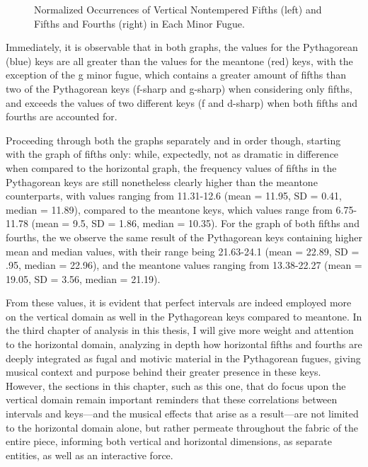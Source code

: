 \begin{figure}[H]
    \begin{center}
    \caption[Normalized Occurrences of Vertical Nontempered Fifths and Fourths in Each Minor Fugue. ]{Normalized Occurrences of Vertical Nontempered Fifths (left) and Fifths and Fourths (right) in Each Minor Fugue.}
    \end{center}
\end{figure}
    
    Immediately, it is observable that in both graphs, the values for the
Pythagorean (blue) keys are all greater than the values for the meantone
(red) keys, with the exception of the g minor fugue, which contains a
greater amount of fifths than two of the Pythagorean keys (f-sharp and
g-sharp) when considering only fifths, and exceeds the values of two
different keys (f and d-sharp) when both fifths and fourths are
accounted for.

Proceeding through both the graphs separately and in order though,
starting with the graph of fifths only: while, expectedly, not as
dramatic in difference when compared to the horizontal graph, the
frequency values of fifths in the Pythagorean keys are still nonetheless
clearly higher than the meantone counterparts, with values ranging from
11.31-12.6 (mean = 11.95, SD = 0.41, median = 11.89), compared to the
meantone keys, which values range from 6.75-11.78 (mean = 9.5, SD =
1.86, median = 10.35). For the graph of both fifths and fourths, the we
observe the same result of the Pythagorean keys containing higher mean
and median values, with their range being 21.63-24.1 (mean = 22.89, SD =
.95, median = 22.96), and the meantone values ranging from 13.38-22.27
(mean = 19.05, SD = 3.56, median = 21.19).

From these values, it is evident that perfect intervals are indeed
employed more on the vertical domain as well in the Pythagorean keys
compared to meantone. In the third chapter of analysis in this thesis, I
will give more weight and attention to the horizontal domain, analyzing
in depth how horizontal fifths and fourths are deeply integrated as
fugal and motivic material in the Pythagorean fugues, giving musical
context and purpose behind their greater presence in these keys.
However, the sections in this chapter, such as this one, that do focus
upon the vertical domain remain important reminders that these
correlations between intervals and keys---and the musical effects
that arise as a result---are not limited to the horizontal domain
alone, but rather permeate throughout the fabric of the entire piece,
informing both vertical and horizontal dimensions, as separate entities,
as well as an interactive force.

